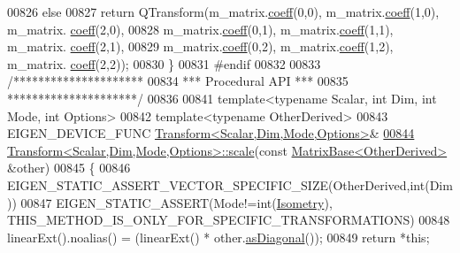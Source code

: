 \begin{DoxyCode}
00826   \textcolor{keywordflow}{else}
00827     \textcolor{keywordflow}{return} QTransform(m\_matrix.\hyperlink{class_eigen_1_1_plain_object_base_afbfc12954f16d21aedb7bd839f64a278}{coeff}(0,0), m\_matrix.\hyperlink{class_eigen_1_1_plain_object_base_afbfc12954f16d21aedb7bd839f64a278}{coeff}(1,0), m\_matrix.
      \hyperlink{class_eigen_1_1_plain_object_base_afbfc12954f16d21aedb7bd839f64a278}{coeff}(2,0),
00828                       m\_matrix.\hyperlink{class_eigen_1_1_plain_object_base_afbfc12954f16d21aedb7bd839f64a278}{coeff}(0,1), m\_matrix.\hyperlink{class_eigen_1_1_plain_object_base_afbfc12954f16d21aedb7bd839f64a278}{coeff}(1,1), m\_matrix.
      \hyperlink{class_eigen_1_1_plain_object_base_afbfc12954f16d21aedb7bd839f64a278}{coeff}(2,1),
00829                       m\_matrix.\hyperlink{class_eigen_1_1_plain_object_base_afbfc12954f16d21aedb7bd839f64a278}{coeff}(0,2), m\_matrix.\hyperlink{class_eigen_1_1_plain_object_base_afbfc12954f16d21aedb7bd839f64a278}{coeff}(1,2), m\_matrix.
      \hyperlink{class_eigen_1_1_plain_object_base_afbfc12954f16d21aedb7bd839f64a278}{coeff}(2,2));
00830 \}
00831 \textcolor{preprocessor}{#endif}
00832 
00833 \textcolor{comment}{/*********************}
00834 \textcolor{comment}{*** Procedural API ***}
00835 \textcolor{comment}{*********************/}
00836 
00841 \textcolor{keyword}{template}<\textcolor{keyword}{typename} Scalar, \textcolor{keywordtype}{int} Dim, \textcolor{keywordtype}{int} Mode, \textcolor{keywordtype}{int} Options>
00842 \textcolor{keyword}{template}<\textcolor{keyword}{typename} OtherDerived>
00843 EIGEN\_DEVICE\_FUNC \hyperlink{group___geometry___module_class_eigen_1_1_transform}{Transform<Scalar,Dim,Mode,Options>}&
\hyperlink{group___geometry___module_a3b9bea8c03133f7bf19c444b6fa27968}{00844} \hyperlink{group___geometry___module_class_eigen_1_1_transform}{Transform<Scalar,Dim,Mode,Options>::scale}(\textcolor{keyword}{const} 
      \hyperlink{group___core___module_class_eigen_1_1_matrix_base}{MatrixBase<OtherDerived>} &other)
00845 \{
00846   EIGEN\_STATIC\_ASSERT\_VECTOR\_SPECIFIC\_SIZE(OtherDerived,\textcolor{keywordtype}{int}(Dim))
00847   EIGEN\_STATIC\_ASSERT(Mode!=\textcolor{keywordtype}{int}(\hyperlink{group__enums_ggaee59a86102f150923b0cac6d4ff05107a080cd5366173608f701cd945c2335568}{Isometry}), THIS\_METHOD\_IS\_ONLY\_FOR\_SPECIFIC\_TRANSFORMATIONS)
00848   linearExt().noalias() = (linearExt() * other.\hyperlink{group___core___module_a14235b62c90f93fe910070b4743782d0}{asDiagonal}());
00849   \textcolor{keywordflow}{return} *\textcolor{keyword}{this};

\end{DoxyCode}
